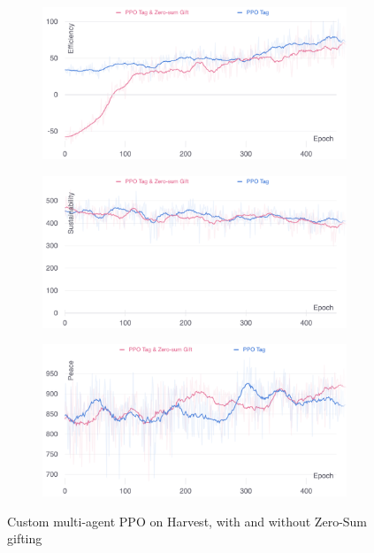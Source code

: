 \documentclass{article}
\begin{document}
\begin{figure}[h]
  \centering
  \begin{subfigure}[b]{0.3\textwidth}
    \centering
    \includegraphics[width=\textwidth]{../assets/ppo-tag-gift-vs-nogift-efficiency}
  \end{subfigure}
  \hfill
  \begin{subfigure}[b]{0.3\textwidth}
    \centering
    \includegraphics[width=\textwidth]{../assets/ppo-tag-gift-vs-nogift-sustainability}
  \end{subfigure}
  \hfill
  \begin{subfigure}[b]{0.3\textwidth}
    \centering
    \includegraphics[width=\textwidth]{../assets/ppo-tag-gift-vs-nogift-peace}
  \end{subfigure}
  \caption{Custom multi-agent PPO on Harvest, with and without Zero-Sum gifting}
  \label{fig:ppo-gift-nogift}
\end{figure}
\end{document}
